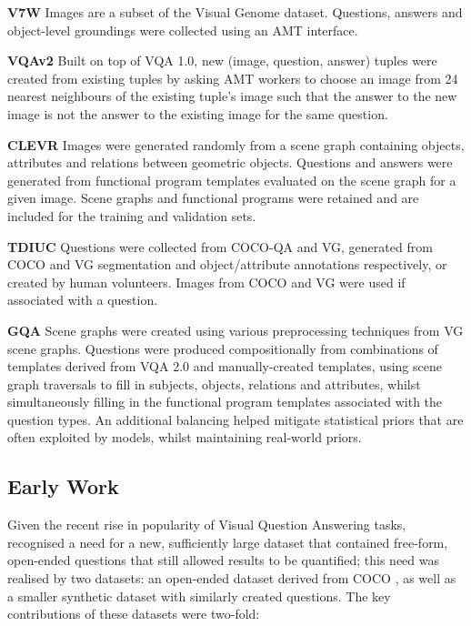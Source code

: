 \textbf{V7W} \cite{zhu2016visual7w} Images are a subset of the Visual Genome dataset. Questions, answers and object-level groundings were collected using an AMT interface.

\textbf{VQAv2} \cite{goyal2017making, zhang2016yin} Built on top of VQA 1.0, new (image, question, answer) tuples were created from existing tuples by asking AMT workers to choose an image from 24 nearest neighbours of the existing tuple's image such that the answer to the new image is not the answer to the existing image for the same question.

\textbf{CLEVR} \cite{johnson2017clevr} Images were generated randomly from a scene graph containing objects, attributes and relations between geometric objects. Questions and answers were generated from functional program templates evaluated on the scene graph for a given image. Scene graphs and functional programs were retained and are included for the training and validation sets.

\textbf{TDIUC} \cite{kafle2017analysis} Questions were collected from COCO-QA and VG, generated from COCO and VG segmentation and object/attribute annotations respectively, or created by human volunteers. Images from COCO and VG were used if associated with a question.

\textbf{GQA} \cite{hudson2019gqa} Scene graphs were created using various preprocessing techniques from VG scene graphs. Questions were produced compositionally from combinations of templates derived from VQA 2.0 and manually-created templates, using scene graph traversals to fill in subjects, objects, relations and attributes, whilst simultaneously filling in the functional program templates associated with the question types. An additional balancing helped mitigate statistical priors that are often exploited by models, whilst maintaining real-world priors.


\subsection{Early Work} 

Given the recent rise in popularity of Visual Question Answering tasks, \citeauthor{antol2015vqa} recognised a need for a new, sufficiently large dataset that contained free-form, open-ended questions that still allowed results to be quantified; this need was realised by two datasets: an open-ended dataset derived from COCO \cite{lin2014microsoft}, as well as a smaller synthetic dataset with similarly created questions.\cite{antol2015vqa} The key contributions of these datasets were two-fold:

